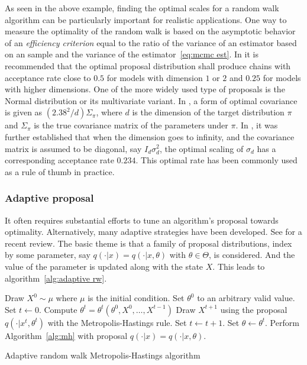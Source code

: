 As seen in the above example, finding the optimal scales for a random walk
algorithm can be particularly important for realistic applications. One way to
measure the optimality of the random walk is based on the asymptotic behavior
of an \emph{efficiency criterion} equal to the ratio of the variance of an
estimator based on an \iid sample and the variance of the
estimator~\ref{eq:mcmc est}. In \cite{Roberts:1997dg} it is recommended that
the optimal proposal distribution shall produce chains with acceptance rate
close to $0.5$ for models with dimension $1$ or $2$ and $0.25$ for models with
higher dimensions. One of the more widely used type of proposals is the Normal
distribution or its multivariate variant. In \cite{Gelman:1995vx}, a form of
optimal covariance is given as $(2.38^2/d)\Sigma_{\pi}$, where $d$ is the
dimension of the target distribution $\pi$ and $\Sigma_{\pi}$ is the true
covariance matrix of the parameters under $\pi$. In \cite{Roberts:2001ta}, it
was further established that when the dimension goes to infinity, and the
covariance matrix is assumed to be diagonal, say $I_d\sigma_d^2$, the optimal
scaling of $\sigma_d$ has a corresponding acceptance rate $0.234$. This
optimal rate has been commonly used as a rule of thumb in practice.

\subsubsection{Adaptive proposal}
\label{ssub:Adaptive proposal}

It often requires substantial efforts to tune an algorithm's proposal towards
optimality. Alternatively, many adaptive strategies have been developed. See
\cite{Andrieu:2008kh} for a recent review. The basic theme is that a family of
proposal distributions, index by some parameter, say $q(\cdot|x) = q(\cdot|x,
\theta)$ with $\theta\in\Theta$, is considered. And the value of the parameter
is updated along with the state $X$. This leads to algorithm~\ref{alg:adaptive
  rw}.

\begin{algorithm}
\begin{algorithmic}
  \tophrule
  \STATE Draw $X^0\sim\mu$ where $\mu$ is the initial condition.
  \STATE Set $\theta^0$ to an arbitrary valid value.
  \STATE Set $t\leftarrow0$.
  \REPEAT
      \STATE Compute $\theta^t = \theta^t(\theta^0,X^0,\dots,X^{t-1})$
      \STATE Draw $X^{t + 1}$ using the proposal $q(\cdot|x^t,\theta^t)$ with
      the Metropolis-Hastings rule.
      \STATE Set $t\leftarrow t+1$.
  \STATE Set $\theta\leftarrow\theta^t$.
  \STATE Perform Algorithm~\ref{alg:mh} with proposal $q(\cdot|x) =
  q(\cdot|x,\theta)$.
  \bottomhrule
\end{algorithmic}
\caption{Adaptive random walk Metropolis-Hastings algorithm}
\label{alg:adaptive rw}
\end{algorithm}

